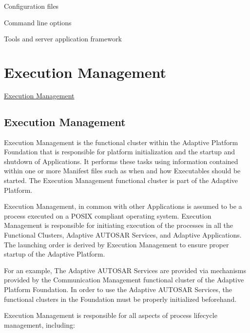 \begin{DoxyItemize}
\begin{DoxyItemize}
\begin{DoxyItemize}
\item Configuration files
\item Command line options
\item Tools and server application framework 
\end{DoxyItemize}
\end{DoxyItemize}
\end{DoxyItemize}\hypertarget{adaptive_executionmanagement}{}\section{Execution Management}\label{adaptive_executionmanagement}

\begin{DoxyItemize}
\item \hyperlink{execution_management}{Execution Management} 
\end{DoxyItemize}\hypertarget{execution_management}{}\subsection{Execution Management}\label{execution_management}
Execution Management is the functional cluster within the Adaptive Platform Foundation that is responsible for platform initialization and the startup and shutdown of Applications. It performs these tasks using information contained within one or more Manifest files such as when and how Executables should be started. The Execution Management functional cluster is part of the Adaptive Platform.

Execution Management, in common with other Applications is assumed to be a process executed on a P\+O\+S\+IX compliant operating system. Execution Management is responsible for initiating execution of the processes in all the Functional Clusters, Adaptive A\+U\+T\+O\+S\+AR Services, and Adaptive Applications. The launching order is derived by Execution Management to ensure proper startup of the Adaptive Platform.

For an example, The Adaptive A\+U\+T\+O\+S\+AR Services are provided via mechanisms provided by the Communication Management functional cluster of the Adaptive Platform Foundation. In order to use the Adaptive A\+U\+T\+O\+S\+AR Services, the functional clusters in the Foundation must be properly initialized beforehand.

Execution Management is responsible for all aspects of process lifecycle management, including\+:


